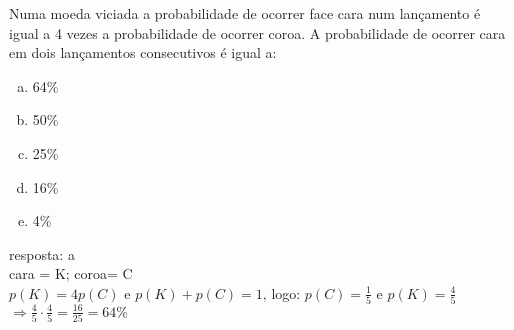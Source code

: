 \begin{ex}
 Numa moeda viciada a probabilidade de ocorrer face cara num lançamento é igual a 4 vezes a probabilidade de ocorrer coroa. A probabilidade de ocorrer cara em dois lançamentos consecutivos é igual a:
    \begin{enumerate}[(a)]
    \item 64\%
    \item 50\%
    \item 25\%
    \item 16\%
    \item 4\%
    \end{enumerate}
      \begin{sol}
      resposta: a\\
      cara = K; coroa= C\\
      $p(K)=4p(C)$ e $p(K)+p(C)=1$, logo:  $p(C)=\frac{1}{5}$ e $p(K)=\frac{4}{5}$ \\
      $\Longrightarrow \frac{4}{5}\cdot\frac{4}{5}=\frac{16}{25}=64\%$
      \end{sol}
\end{ex}